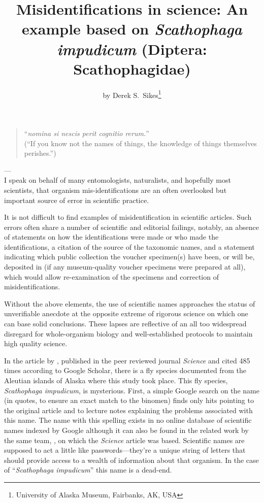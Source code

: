 \title{Misidentifications in science: An example based on \textit{Scathophaga impudicum} (Diptera: Scathophagidae)}

\subtitle{}

\author{by Derek S.\ Sikes\footnote{University of Alaska Museum, Fairbanks, AK, USA}}

\maketitle

\begin{quotation}
``{\itshape nomina si nescis perit cognitio rerum.}''\\
(``If you know not the names of things, the knowledge of things themselves perishes.'')
\end{quotation}

\hfill---\citet{Coke1628}
\\

I speak on behalf of many entomologists, naturalists, and hopefully most scientists, that organism mis-identifications are an often overlooked but important source of error in scientific practice.

It is not difficult to find examples of misidentification in scientific articles. Such errors often share a number of scientific and editorial failings, notably, an absence of statements on how the identifications were made or who made the identifications, a citation of the source of the taxonomic names, and a statement indicating which public collection the voucher specimen(s) have been, or will be, deposited in (if any museum-quality voucher specimens were prepared at all), which would allow re-examination of the specimens and correction of misidentifications. 

Without the above elements, the use of scientific names approaches the status of unverifiable anecdote at the opposite extreme of rigorous science on which one can base solid conclusions. These lapses are reflective of an all too widespread disregard for whole-organism biology and well-established protocols to maintain high quality science.

In the article by \citet{Croll2005}, published in the peer reviewed journal \textit{Science} and cited 485 times according to Google Scholar, there is a fly species documented from the Aleutian islands of Alaska where this study took place. This fly species, \textit{Scathophaga impudicum}, is mysterious. First, a simple Google search on the name (in quotes, to ensure an exact match to the binomen) finds only hits pointing to the original article and to lecture notes explaining the problems associated with this name. The name with this spelling exists in no online database of scientific names indexed by Google although it can also be found in the related work by the same team, \citet{Maronetal2006}, on which the \textit{Science} article was based. Scientific names are supposed to act a little like passwords---they’re a unique string of letters that should provide access to a wealth of information about that organism. In the case of “\textit{Scathophaga impudicum}” this name is a dead-end.

